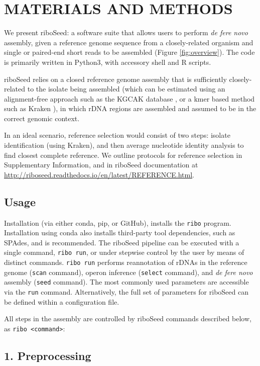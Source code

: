 \documentclass[a4,center,fleqn]{NAR}
\begin{document}
\section{MATERIALS AND METHODS}
We present riboSeed: a software suite that allows users to perform \textit{de fere novo} assembly, given a reference genome sequence from a closely-related organism and single or paired-end short reads to be assembled (Figure \ref{fig:overview}). The code is primarily written in Python3, with accessory shell and R scripts.


riboSeed relies on a closed reference genome assembly that is sufficiently closely-related to the isolate being assembled (which can be estimated using an alignment-free approach such as the KGCAK database \cite{Wang2015b}, or a kmer based method such as Kraken \cite{Wood2014}), in which rDNA regions are assembled and assumed to be in the correct genomic context.

In an ideal scenario, reference selection would consist of two steps:  isolate identification (using Kraken), and then average nucleotide identity analysis to find closest complete reference. We outline protocols for reference selection in Supplementary Information, and in riboSeed documentation at \url{http://riboseed.readthedocs.io/en/latest/REFERENCE.html}.

\subsection*{Usage}
Installation (via either conda, pip, or GitHub), installs the \texttt{ribo} program. Installation using conda also installs third-party tool dependencies, such as SPAdes, and is recommended. The riboSeed pipeline can be executed with a single command, \texttt{ribo run}, or under stepwise control by the user by means of distinct commands. \texttt{ribo run} performs reannotation of rDNAs in the reference genome (\texttt{scan} command), operon inference (\texttt{select} command), and \textit{de fere novo} assembly (\texttt{seed} command).  The most commonly used parameters are accessible via the \texttt{run} command. Alternatively, the full set of parameters for riboSeed can be defined within a configuration file.

All steps in the assembly are controlled by riboSeed commands described below, as \texttt{ribo <command>}:

\subsection*{1. Preprocessing}
\end{document}
